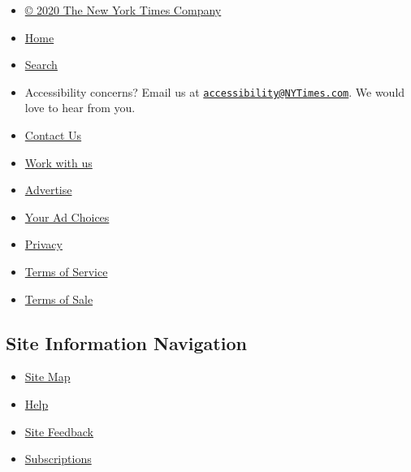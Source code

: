 \begin{itemize}
\tightlist
\item
  \href{https://help.nytimes3xbfgragh.onion/hc/en-us/articles/115014792127-Copyright-notice}{©
  2020 The New York Times Company}
\item
  \href{https://www.nytimes3xbfgragh.onion}{Home}
\item
  \href{https://www.nytimes3xbfgragh.onion/search/}{Search}
\item
  Accessibility concerns? Email us at
  \href{mailto:accessibility@NYTimes.com}{\nolinkurl{accessibility@NYTimes.com}}.
  We would love to hear from you.
\item
  \href{https://help.nytimes3xbfgragh.onion/hc/en-us/articles/115015385887-Contact-Us}{Contact
  Us}
\item
  \href{https://www.nytco.com/careers/}{Work with us}
\item
  \href{https://nytmediakit.com/}{Advertise}
\item
  \href{https://help.nytimes3xbfgragh.onion/hc/en-us/articles/115014892108-Privacy-policy\#pp}{Your
  Ad Choices}
\item
  \href{https://help.nytimes3xbfgragh.onion/hc/en-us/articles/115014892108-Privacy-policy}{Privacy}
\item
  \href{https://help.nytimes3xbfgragh.onion/hc/en-us/articles/115014893428-Terms-of-service}{Terms
  of Service}
\item
  \href{https://help.nytimes3xbfgragh.onion/hc/en-us/articles/115014893968-Terms-of-sale}{Terms
  of Sale}
\end{itemize}

\hypertarget{site-information-navigation-1}{%
\subsection{Site Information
Navigation}\label{site-information-navigation-1}}

\begin{itemize}
\tightlist
\item
  \href{https://spiderbites.nytimes3xbfgragh.onion}{Site Map}
\item
  \href{https://help.nytimes3xbfgragh.onion/hc/en-us}{Help}
\item
  \href{https://help.nytimes3xbfgragh.onion/hc/en-us/articles/115015385887-Contact-Us?redir=myacc}{Site
  Feedback}
\item
  \href{https://www.nytimes3xbfgragh.onion/subscription?campaignId=37WXW}{Subscriptions}
\end{itemize}
